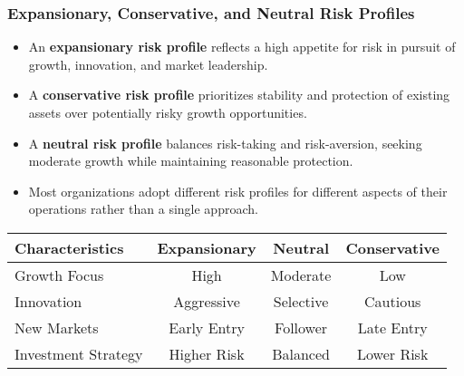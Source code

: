 \documentclass{beamer}
\begin{document}
        \begin{frame}
          \frametitle{Expansionary, Conservative, and Neutral Risk Profiles}
          \begin{itemize}
            \item An \textbf{expansionary risk profile} reflects a high appetite for risk in pursuit of growth, innovation, and market leadership.
            \item A \textbf{conservative risk profile} prioritizes stability and protection of existing assets over potentially risky growth opportunities.
            \item A \textbf{neutral risk profile} balances risk-taking and risk-aversion, seeking moderate growth while maintaining reasonable protection.
            \item Most organizations adopt different risk profiles for different aspects of their operations rather than a single approach.
          \end{itemize}
          
          \begin{table}
          \centering
          \begin{tabular}{lccc}
          \toprule
          \textbf{Characteristics} & \textbf{Expansionary} & \textbf{Neutral} & \textbf{Conservative} \\
          \midrule
          Growth Focus & High & Moderate & Low \\
          Innovation & Aggressive & Selective & Cautious \\
          New Markets & Early Entry & Follower & Late Entry \\
          Investment Strategy & Higher Risk & Balanced & Lower Risk \\
          \bottomrule
          \end{tabular}
          \end{table}
          \end{frame}
          
\end{document}
